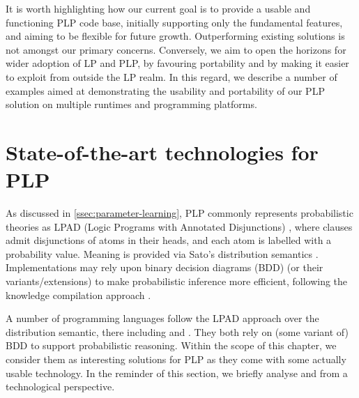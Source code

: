 \documentclass[12pt,a4paper,openright,twoside]{book}
\begin{document}
It is worth highlighting how our current goal is to provide a usable and functioning PLP code base, initially supporting only the fundamental features, and aiming to be flexible for future growth.
%
Outperforming existing solutions is not amongst our primary concerns.
%
Conversely, we aim to open the horizons for wider adoption of LP and PLP, by favouring portability and by making it easier to exploit from outside the LP realm.
%
In this regard, we describe a number of examples aimed at demonstrating the usability and portability of our PLP solution on multiple runtimes and programming platforms.

\section{State-of-the-art technologies for PLP}\label{sec:background}

As discussed in \cref{ssec:parameter-learning}, PLP commonly represents probabilistic theories as LPAD (Logic Programs with Annotated Disjunctions) \cite{VennekensVB04}, where clauses admit disjunctions of atoms in their heads, and each atom is labelled with a probability value.
%
Meaning is provided via Sato's distribution semantics \cite{sato1995,sato-1997}.
%
Implementations may rely upon binary decision diagrams (BDD) \cite{akers1978binary,lovato-2014} (or their variants/extensions) to make probabilistic inference more efficient, following the knowledge compilation approach \cite{bellodi2013expectation,vlasselaer2014compiling}.

A number of programming languages follow the LPAD approach over the distribution semantic, there including \problog{} and \cplint{}.
%
They both rely on (some variant of) BDD to support probabilistic reasoning.
%
Within the scope of this chapter, we consider them as interesting solutions for PLP as they come with some actually usable technology.
%
In the reminder of this section, we briefly analyse \problog{} and \cplint{} from a technological perspective.

\paragraph{\problog{}}
\end{document}
